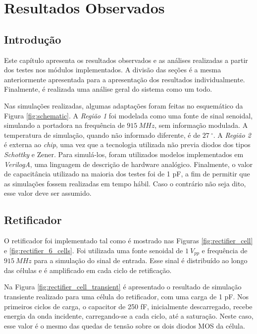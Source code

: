 \chapter{Resultados Observados}\label{Resultados}

\section{Introdução}
Este capítulo apresenta os resultados observados e as análises realizadas a partir dos testes nos módulos implementados. A divisão das seções é a mesma anteriormente apresentada para a apresentação dos resultados individualmente. Finalmente, é realizada uma análise geral do sistema como um todo.

Nas simulações realizadas, algumas adaptações foram feitas no esquemático da Figura \ref{fig:schematic}. A \textit{Região 1} foi modelada como uma fonte de sinal senoidal, simulando a portadora na frequência de $915~MHz$, sem informação modulada. A temperatura de simulação, quando não informado diferente, é de $27~^{\circ}$. A \textit{Região 2} é externa ao \textit{chip}, uma vez que a tecnologia utilizada não previa diodos dos tipos \textit{Schottky} e Zener. Para simulá-los, foram utilizados modelos implementados em \textit{VerilogA}, uma linguagem de descrição de hardware analógico. Finalmente, o valor de capacitância utilizado na maioria dos testes foi de 1 pF, a fim de permitir que as simulações fossem realizadas em tempo hábil. Caso o contrário não seja dito, esse valor deve ser assumido.


\section{Retificador}
O retificador foi implementado tal como é mostrado nas Figuras \ref{fig:rectifier_cell} e \ref{fig:rectifier_6_cells}. Foi utilizada uma fonte senoidal de $1~V_{pp}$ e frequência de $915~MHz$ para a simulação do sinal de entrada. Esse sinal é distribuído ao longo das células e é amplificado em cada ciclo de retificação.

Na Figura \ref{fig:rectifier_cell_transient} é apresentado o resultado de simulação transiente realizado para uma célula do retificador, com uma carga de 1 pF. Nos primeiros ciclos de carga, o capacitor de 250 fF, inicialmente descarregado, recebe energia da onda incidente, carregando-se a cada ciclo, até a saturação. Neste caso, esse valor é o mesmo das quedas de tensão sobre os dois diodos MOS da célula.

